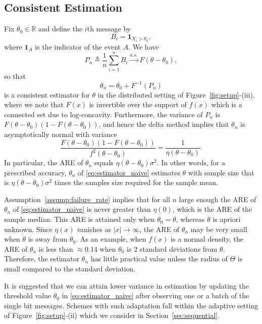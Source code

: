 \documentclass[letterpaper, 11pt]{IEEEtran}      %
\begin{document}
\subsection{Consistent Estimation}
Fix $\theta_0 \in \mathbb R$ and define the $i$th message by 
\[
B_i = \mathbf 1_{X_i>\theta_0}, 
\]
where $\mathbf 1_A$ is the indicator of the event $A$. We have
\[
P_n \triangleq\frac{1}{n} \sum_{i=1}^n B_i \overset{a.s.}{\rightarrow} F(\theta - \theta_0),  
\]
so that 
\begin{equation}
\label{eq:estimator_naive}
{\theta}_n = \theta_0 + F^{-1}\left( P_n \right)
\end{equation}
is a consistent estimator for $\theta$ in the distributed setting of Figure~\ref{fig:setup}-(iii), where we note that $F(x)$ is invertible over the support of $f(x)$ which is a connected set due to log-concavity. Furthermore, the variance of $P_n$ is $F(\theta-\theta_0)\left(1-F(\theta-\theta_0)\right)$, and hence the delta method implies that ${\theta}_n$ is asymptotically normal with variance 
\begin{equation} 
 \frac{F(\theta-\theta_0)\left(1-F(\theta-\theta_0)\right)}{f^2(\theta-\theta_0)} = \frac{1}{
\eta(\theta-\theta_0)}.
\end{equation}
In particular, the ARE of ${\theta}_n$ equals $\eta(\theta - \theta_0)\sigma^2$. In other words, for a prescribed accuracy, ${\theta}_n$ of  \eqref{eq:estimator_naive} estimates $\theta$ with sample size that is $\eta(\theta- \theta_0)  \sigma^2$ times the samples size required for the sample mean. \par
%
%
Assumption~\ref{assump:failure_rate} implies that for  all $n$ large enough the ARE of ${\theta}_n$ of \eqref{eq:estimator_naive} is never greater than $\eta(0)$, which is the ARE of the sample median. This ARE is attained only when $\theta_0 = \theta$, whereas $\theta$ is apriori unknown. Since $\eta(x)$ vanishes as $|x|\rightarrow \infty$, the ARE of ${\theta}_n$ may be very small when $\theta$ is away from $\theta_0$. As an example, when $f(x)$ is a normal density, the ARE of ${\theta}_n$ is less than $\approx 0.14$ when $\theta_0$ is $2$ standard deviations from $\theta$. Therefore, the estimator ${\theta}_n$ has little practical value unless the radius of $\Theta$ is small compared to the standard deviation. \par 
It is suggested that we can attain lower variance in estimation by updating the threshold value $\theta_0$ in \eqref{eq:estimator_naive} after observing one or a batch of the single bit messages. Schemes with such adaptation fall within the adaptive setting of Figure~\ref{fig:setup}-(ii) which we consider in Section~\ref{sec:sequential}. \par
\end{document}
